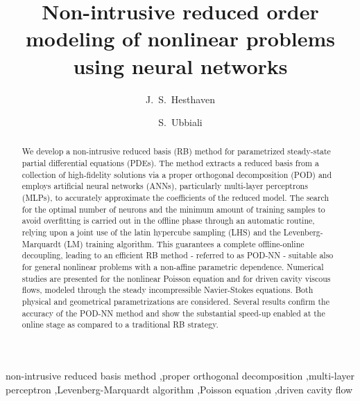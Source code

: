 \documentclass[longtitle]{elsarticle}
\numberwithin{equation}{section}
\theoremstyle{theorem}
\theoremstyle{definition}
\theoremstyle{remark}
\theoremstyle{proposition}
\numberwithin{figure}{section}
\begin{document}
	\linenumbers

	
	\begin{frontmatter}
		\title{Non-intrusive reduced order modeling of nonlinear problems \\ using neural networks}
		
		\author[epfl]{J.~S.~Hesthaven}
		
		\author[epfl,polimi]{S.~Ubbiali}
		
		\address[epfl]{\'Ecole Polytechnique F\'ed\'erale de Lausanne (EPFL), Route Cantonale, 1015 Lausanne, Switzerland}
		\address[polimi]{Politecnico di Milano, Piazza Leonardo da Vinci 32, 20133 Milan, Italy}
		
		\begin{abstract}
			\begin{linenumbers}
			We develop a non-intrusive reduced basis (RB) method for pa\-ra\-me\-tri\-zed steady-state partial differential equations (PDEs). The method extracts a reduced basis from a collection of high-fidelity solutions via a proper orthogonal decomposition (POD) and employs artificial neural networks (ANNs), particularly multi-layer perceptrons (MLPs), to accurately approximate the coefficients of the reduced model. The search for the optimal number of neurons and the minimum amount of training samples to avoid overfitting is carried out in the offline phase through an automatic routine, relying upon a joint use of the latin hypercube sampling (LHS) and the Levenberg-Marquardt (\textcolor{deepgreen}{LM}) training algorithm. This guarantees a complete offline-online decoupling, leading to an efficient RB method - referred to as POD-NN - suitable also for general nonlinear problems with a non-affine parametric dependence. Numerical studies are presented for the nonlinear Poisson equation and for driven cavity viscous flows, modeled through the steady incompressible Navier-Stokes equations. Both physical and geometrical parametrizations are considered. Several results confirm the accuracy of the POD-NN method and show the substantial speed-up enabled at the online stage as compared to a traditional RB strategy.		
			\end{linenumbers}
		\end{abstract}
		
		\begin{keyword}
			non-intrusive reduced basis method \sep proper orthogonal decomposition \sep multi-layer perceptron \sep Levenberg-Marquardt algorithm \sep Poisson equation \sep driven cavity flow
		\end{keyword}
	\end{frontmatter}
	
\end{document}
